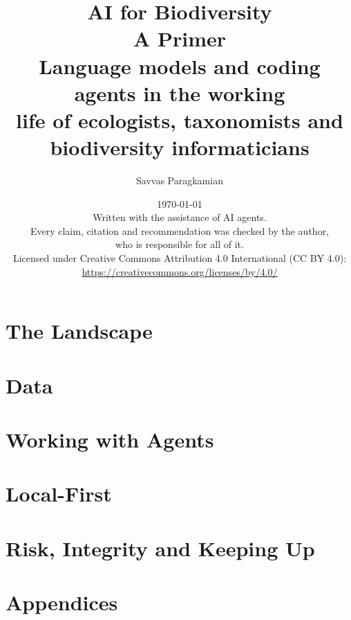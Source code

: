 \documentclass[11pt,a4paper,oneside]{book}
\title{AI for Biodiversity\\[0.3em]\large A Primer\\[0.8em]\normalsize\normalfont Language models and coding agents in the working\\life of ecologists, taxonomists and biodiversity informaticians}
\author{Savvas Paragkamian}
\date{%
  \today\\[2em]
  \normalsize\normalfont
  Written with the assistance of AI agents.\\
  Every claim, citation and recommendation was checked by the author,\\
  who is responsible for all of it.\\[2em]
  \small Licensed under Creative Commons Attribution 4.0 International
  (CC BY 4.0):\\
  \url{https://creativecommons.org/licenses/by/4.0/}%
}
\begin{document}
\frontmatter

\maketitle

\tableofcontents



\mainmatter

\part{The Landscape}





\part{Data}



\part{Working with Agents}






\part{Local-First}




\part{Risk, Integrity and Keeping Up}





\appendix
\part{Appendices}





\backmatter

\printbibliography[heading=bibintoc,title={References}]
\end{document}

